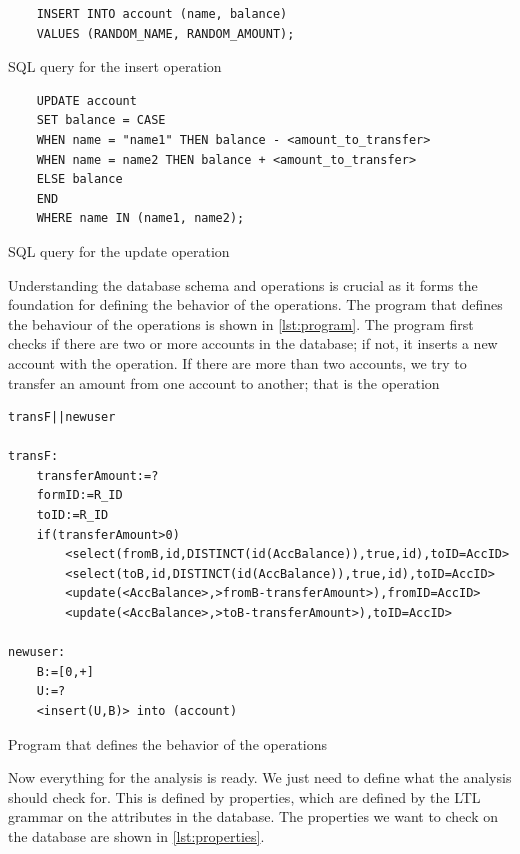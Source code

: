 \begin{listing}[htb!]
\begin{verbatim}
    INSERT INTO account (name, balance)
    VALUES (RANDOM_NAME, RANDOM_AMOUNT);
\end{verbatim}
\label{lst:sql-queries}
\caption{SQL query for the insert operation}
\end{listing}


\begin{listing}[htb!]
\begin{verbatim}
    UPDATE account
    SET balance = CASE
    WHEN name = "name1" THEN balance - <amount_to_transfer>
    WHEN name = name2 THEN balance + <amount_to_transfer>
    ELSE balance
    END
    WHERE name IN (name1, name2);
\end{verbatim}
\caption{SQL query for the update operation}
\label{lst:sql-queries2}
\end{listing}

Understanding the database schema and operations is crucial as it forms the foundation for defining the behavior of the operations.
The program that defines the behaviour of the operations is shown in \autoref{lst:program}.
The program first checks if there are two or more accounts in the database; if not, it inserts a new account with the  operation.
If there are more than two accounts, we try to transfer an amount from one account to another; that is the  operation

\begin{listing}[htb!]
\begin{verbatim}
transF||newuser

transF:
    transferAmount:=?
    formID:=R_ID
    toID:=R_ID
    if(transferAmount>0)
        <select(fromB,id,DISTINCT(id(AccBalance)),true,id),toID=AccID>
        <select(toB,id,DISTINCT(id(AccBalance)),true,id),toID=AccID>
        <update(<AccBalance>,>fromB-transferAmount>),fromID=AccID>
        <update(<AccBalance>,>toB-transferAmount>),toID=AccID>

newuser:
    B:=[0,+]
    U:=?
    <insert(U,B)> into (account)
\end{verbatim}
\caption{Program that defines the behavior of the operations}
\label{lst:program}
\end{listing}


Now everything for the analysis is ready.
We just need to define what the analysis should check for.
This is defined by properties, which are defined by the LTL grammar on the attributes in the database.
The properties we want to check on the database are shown in \autoref{lst:properties}.

